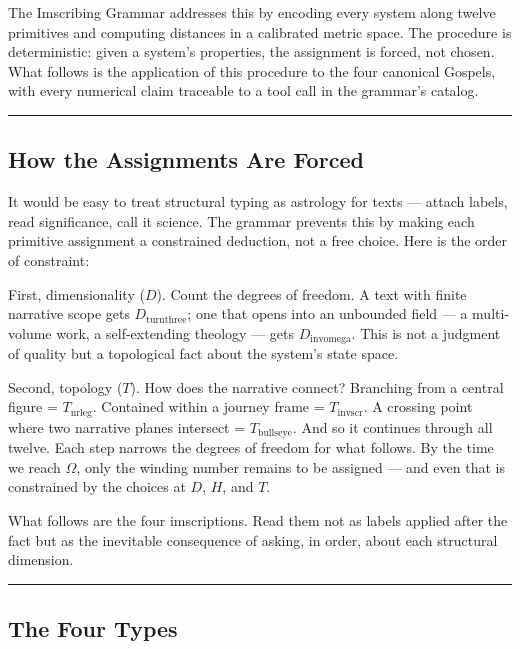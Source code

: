 \documentclass[12pt,a4paper]{article}
\begin{document}
The Imscribing Grammar addresses this by encoding every system along twelve primitives and computing distances in a calibrated metric space. The procedure is deterministic: given a system's properties, the assignment is forced, not chosen. What follows is the application of this procedure to the four canonical Gospels, with every numerical claim traceable to a tool call in the grammar's catalog.

\begin{center}
\rule{0.5\textwidth}{0.4pt}
\end{center}

\subsection{How the Assignments Are Forced}

It would be easy to treat structural typing as astrology for texts --- attach labels, read significance, call it science. The grammar prevents this by making each primitive assignment a constrained deduction, not a free choice. Here is the order of constraint:

First, dimensionality ($D$). Count the degrees of freedom. A text with finite narrative scope gets $D_{\text{turnthree}}$; one that opens into an unbounded field --- a multi-volume work, a self-extending theology --- gets $D_{\text{invomega}}$. This is not a judgment of quality but a topological fact about the system's state space.

Second, topology ($T$). How does the narrative connect? Branching from a central figure = $T_{\text{nrleg}}$. Contained within a journey frame = $T_{\text{invscr}}$. A crossing point where two narrative planes intersect = $T_{\text{bullseye}}$.
And so it continues through all twelve. Each step narrows the degrees of freedom for what follows. By the time we reach $\Omega$, only the winding number remains to be assigned --- and even that is constrained by the choices at $D$, $H$, and $T$.

What follows are the four imscriptions. Read them not as labels applied after the fact but as the inevitable consequence of asking, in order, about each structural dimension.

\begin{center}
\rule{0.5\textwidth}{0.4pt}
\end{center}

\subsection{The Four Types}
\end{document}
